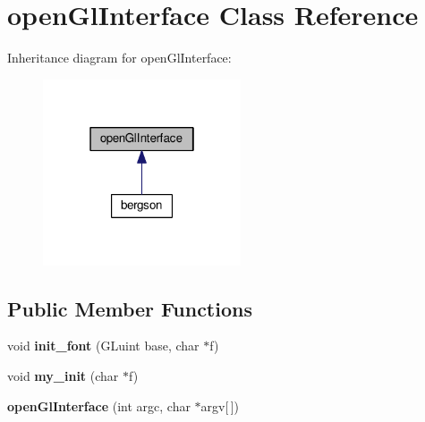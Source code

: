 \hypertarget{classopenGlInterface}{}\section{open\+Gl\+Interface Class Reference}
\label{classopenGlInterface}


Inheritance diagram for open\+Gl\+Interface\+:
\nopagebreak
\begin{figure}[H]
\begin{center}
\leavevmode
\includegraphics[width=166pt]{classopenGlInterface__inherit__graph}
\end{center}
\end{figure}
\subsection*{Public Member Functions}
\begin{DoxyCompactItemize}
\item 
\mbox{\label{classopenGlInterface_aeba8c342b0d0f3c1810c641d2b6c50c0}} 
void {\bfseries init\+\_\+font} (G\+Luint base, char $\ast$f)
\item 
\mbox{\label{classopenGlInterface_aafdfc29720767f92ad1214516ed1dae5}} 
void {\bfseries my\+\_\+init} (char $\ast$f)
\item 
\mbox{\label{classopenGlInterface_ad79fa9755d5c4e6210db8a9c265791c6}} 
{\bfseries open\+Gl\+Interface} (int argc, char $\ast$argv\mbox{[}$\,$\mbox{]})
\end{DoxyCompactItemize}
